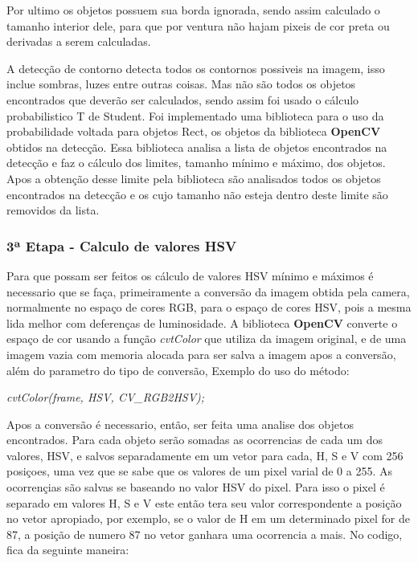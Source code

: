 Por ultimo os objetos possuem sua borda ignorada, sendo assim calculado o tamanho interior dele, para que por ventura não hajam pixeis de cor preta ou derivadas a serem calculadas.
 
 A detecção de contorno detecta todos os contornos possiveis na imagem, isso inclue sombras, luzes entre outras coisas. Mas não são todos os objetos encontrados que deverão ser calculados, sendo assim foi usado o cálculo probabilistico T de Student.
 Foi implementado uma biblioteca para o uso da probabilidade voltada para objetos Rect, os objetos da biblioteca \textbf{OpenCV} obtidos na detecção. Essa biblioteca analisa a lista de objetos encontrados na detecção e faz o cálculo dos limites, tamanho mínimo e máximo, dos objetos. Apos a obtenção desse limite pela biblioteca são analisados todos os objetos encontrados na detecção e os cujo tamanho não esteja dentro deste limite são removidos da lista.
 
 \subsubsection{3ª Etapa - Calculo de valores HSV}
 Para que possam ser feitos os cálculo de valores HSV mínimo e máximos é necessario que se faça, primeiramente a conversão da imagem obtida pela camera, normalmente no espaço de cores RGB, para o espaço de cores HSV, pois a mesma lida melhor com deferenças de luminosidade. 
 A biblioteca \textbf{OpenCV} converte o espaço de cor usando a função \textit{cvtColor} que utiliza da imagem original, e de uma imagem vazia com memoria alocada para ser salva a imagem apos a conversão, além do parametro do tipo de conversão, Exemplo do uso do método:
\begin{center}
\centering \textit{cvtColor(frame, HSV, CV\_RGB2HSV);}
\end{center}

Apos a conversão é necessario, então, ser feita uma analise dos objetos encontrados. Para cada objeto serão somadas as ocorrencias de cada um dos valores, HSV, e salvos separadamente em um vetor para cada, H, S e V com 256 posiçoes, uma vez que se sabe que os valores de um pixel varial de 0 a 255. As ocorrençias são salvas se baseando no valor HSV do pixel. Para isso o pixel é separado em valores H, S e V este então tera seu valor correspondente a posição no vetor apropiado, por exemplo, se o valor de H em um determinado pixel for de 87, a posição de numero 87 no vetor ganhara uma ocorrencia a mais. No codigo, fica da seguinte maneira:
	        
